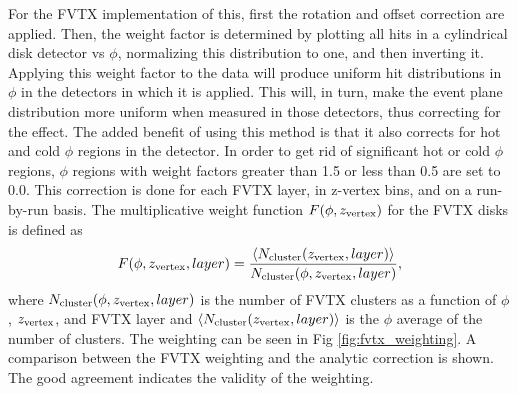 For the FVTX implementation of this, first the rotation and offset correction are applied. Then, the weight factor is determined by plotting all hits in a cylindrical disk detector vs $\phi$, normalizing this distribution to one, and then inverting it. Applying this weight factor to the data will produce uniform hit distributions in $\phi$ in the detectors in which it is applied. This will, in turn, make the event plane distribution more uniform when measured in those detectors, thus correcting for the effect. The added benefit of using this method is that it also corrects for hot and cold $\phi$ regions in the detector. In order to get rid of significant hot or cold $\phi$ regions, $\phi$ regions with weight factors greater than 1.5 or less than 0.5 are set to 0.0. This correction is done for each FVTX layer, in z-vertex bins, and on a run-by-run basis. The multiplicative weight function $F(\phi,z_{\rm vertex})$ for the FVTX disks is defined as 
\begin{equation}
F(\phi,z_{\rm vertex},layer) = \frac{\left<N_{\rm cluster}(z_{\rm vertex},layer)\right>}{N_{\rm cluster}(\phi,z_{\rm vertex},layer)},
\end{equation}
where $N_{\rm cluster}(\phi,z_{\rm vertex},layer)$ is the number of FVTX clusters as a function of $\phi$, $z_{\rm vertex}$, and FVTX layer and $\left<N_{\rm cluster}(z_{\rm vertex},layer)\right>$ is the $\phi$ average of the number of clusters. The weighting can be seen in Fig \ref{fig:fvtx_weighting}. A comparison between the FVTX weighting and the analytic correction is shown. The good agreement indicates the validity of the weighting.


